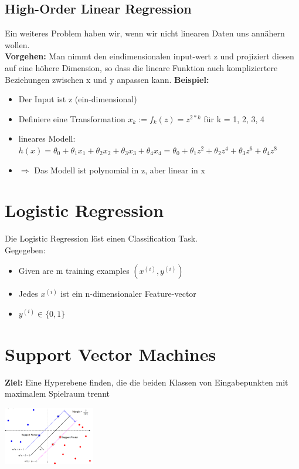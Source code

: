 \documentclass{article}
\newenvironment{Figure}
	{\par\medskip\noindent\minipage{\linewidth}}
	{\endminipage\par\medskip}
\theoremstyle{merke}
\theoremstyle{definition}
\begin{document}
        \subsection{High-Order Linear Regression}
    Ein weiteres Problem haben wir, wenn wir nicht linearen Daten uns annähern wollen.\\
    \textbf{Vorgehen:} Man nimmt den eindimensionalen input-wert z und projiziert diesen auf eine höhere Dimension, so dass die lineare Funktion auch kompliziertere Beziehungen zwischen x und y anpassen kann.
    \textbf{Beispiel:}
    \begin{itemize}
        \item Der Input ist z (ein-dimensional)
        \item Definiere eine Transformation $x_k := f_k(z) = z^{2*k}$ für k = 1, 2, 3, 4
        \item lineares Modell: $h(x) = \theta_0 + \theta_1 x_1 + \theta_2 x_2 + \theta_3 x_3 + \theta_4 x_4 = \theta_0 + \theta_1 z^2 + \theta_2 z^4 + \theta_3 z^6 + \theta_4 z^8$
        \item $\Rightarrow$ Das Modell ist polynomial in z, aber linear in x
    \end{itemize}

    \section{Logistic Regression}
    Die Logistic Regression löst einen Classification Task.\\
    Gegegeben:
    \begin{itemize}
        \item Given are m training examples $(x^{(i)}, y^{(i)})$
        \item Jedes $x^{(i)}$ ist ein n-dimensionaler Feature-vector
        \item $y^{(i)} \in \{0,1\}$
    \end{itemize}

    \section{Support Vector Machines}
    \textbf{Ziel:} Eine Hyperebene finden, die die beiden Klassen von Eingabepunkten mit maximalem Spielraum trennt
    \begin{Figure}
    \centering
    \includegraphics[width=150px]{img/SVMSetting.png}
        \label{fig:Support Vector Machine}
    \end{Figure}
\end{document}
